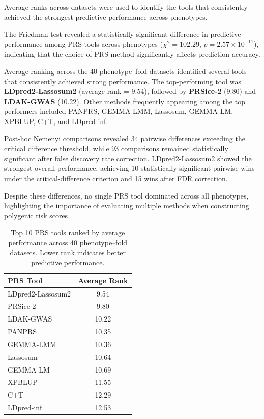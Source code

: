 \documentclass[pdflatex,sn-basic]{sn-jnl}
\begin{document}
Average ranks across datasets were used to identify the tools that consistently achieved the strongest predictive performance across phenotypes.

The Friedman test revealed a statistically significant difference in predictive performance among PRS tools across phenotypes ($\chi^2 = 102.29$, $p = 2.57 \times 10^{-11}$), indicating that the choice of PRS method significantly affects prediction accuracy.

Average ranking across the 40 phenotype–fold datasets identified several tools that consistently achieved strong performance. The top-performing tool was \textbf{LDpred2-Lassosum2} (average rank = 9.54), followed by \textbf{PRSice-2} (9.80) and \textbf{LDAK-GWAS} (10.22). Other methods frequently appearing among the top performers included PANPRS, GEMMA-LMM, Lassosum, GEMMA-LM, XPBLUP, C+T, and LDpred-inf.

Post-hoc Nemenyi comparisons revealed 34 pairwise differences exceeding the critical difference threshold, while 93 comparisons remained statistically significant after false discovery rate correction. LDpred2-Lassosum2 showed the strongest overall performance, achieving 10 statistically significant pairwise wins under the critical-difference criterion and 15 wins after FDR correction.

Despite these differences, no single PRS tool dominated across all phenotypes, highlighting the importance of evaluating multiple methods when constructing polygenic risk scores.
\begin{table}[!ht]
\centering
\begin{tabular}{l c}
\hline
\textbf{PRS Tool} & \textbf{Average Rank} \\
\hline
LDpred2-Lassosum2 & 9.54 \\
PRSice-2 & 9.80 \\
LDAK-GWAS & 10.22 \\
PANPRS & 10.35 \\
GEMMA-LMM & 10.36 \\
Lassosum & 10.64 \\
GEMMA-LM & 10.69 \\
XPBLUP & 11.55 \\
C+T & 12.29 \\
LDpred-inf & 12.53 \\
\hline
\end{tabular}
\caption{Top 10 PRS tools ranked by average performance across 40 phenotype–fold datasets. Lower rank indicates better predictive performance.}
\label{tab:top_prs_tools}
\end{table}
\end{document}
